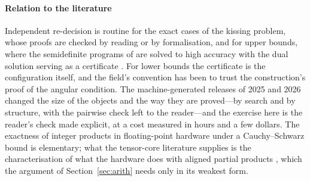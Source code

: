 \documentclass[preprint,11pt,authoryear,a4paper]{elsarticle}
\begin{document}
\paragraph{Relation to the literature} Independent re-decision is routine for the exact cases of the kissing problem, whose proofs are checked by reading \citep{Musin08} or by formalisation, and for upper bounds, where the semidefinite programs of \citet{BachocVallentin08} are solved to high accuracy with the dual solution serving as a certificate \citep{MittelmannVallentin10,LeijenhorstDeLaat24}. For lower bounds the certificate is the configuration itself, and the field's convention has been to trust the construction's proof of the angular condition. The machine-generated releases of 2025 and 2026 \citep{Novikov25,Yang26} changed the size of the objects and the way they are proved---by search and by structure, with the pairwise check left to the reader---and the exercise here is the reader's check made explicit, at a cost measured in hours and a few dollars. The exactness of integer products in floating-point hardware under a Cauchy--Schwarz bound is elementary; what the tensor-core literature supplies is the characterisation of what the hardware does with aligned partial products \citep{Fasi21,Blanchard20,FasiMultiword23,Valpey25,KhattakMikaitis25}, which the argument of Section~\ref{sec:arith} needs only in its weakest form.
\end{document}
